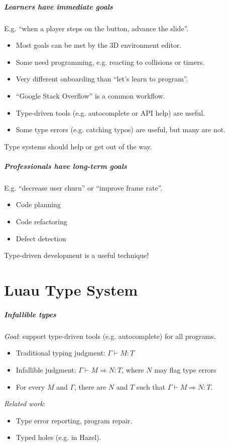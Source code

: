 \documentclass[aspectratio=169]{beamer}
\begin{document}
\begin{frame}

\frametitle{Learners have immediate goals}

E.g. ``when a player steps on the button, advance the slide''.
\begin{itemize}
  \item Most goals can be met by the 3D environment editor.
  \item Some need programming, e.g. reacting to collisions or timers.
  \item Very different onboarding than ``let's learn to program''.
  \item ``Google Stack Overflow'' is a common workflow.
  \item Type-driven tools (e.g. autocomplete or API help) are useful.
  \item Some type errors (e.g. catching typos) are useful, but many are not.
\end{itemize}
Type systems should help or get out of the way.

\end{frame}

\begin{frame}

\frametitle{Professionals have long-term goals}

E.g. ``decrease user churn'' or ``improve frame rate''.
\begin{itemize}
\item Code planning
\item Code refactoring
\item Defect detection
\end{itemize}
Type-driven development is a useful technique!

\end{frame}

\part{Luau Type System}

\begin{frame}

\frametitle{Infallible types}

\emph{Goal}: support type-driven tools (e.g. autocomplete) for all programs.
\begin{itemize}
\item Traditional typing judgment: $\Gamma\vdash M:T$
\item Infallible judgment: $\Gamma\vdash M \Rightarrow N:T$, where $N$ may flag type errors
\item For every $M$ and $\Gamma$,
  there are $N$ and $T$ such that $\Gamma \vdash M \Rightarrow N : T$.
\end{itemize}

\emph{Related work}:
\begin{itemize}
\item Type error reporting, program repair.
\item Typed holes (e.g. in Hazel).
\end{itemize}

\end{frame}
\end{document}
